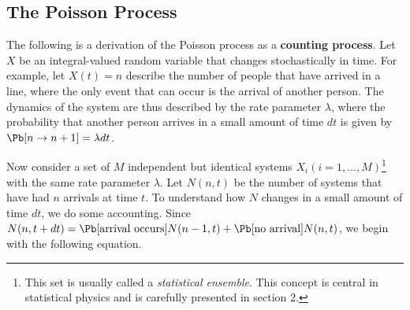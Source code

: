 \subsection{The Poisson Process}
\label{subsection:Poisson_Process}
The following is a derivation of the Poisson process as a \textbf{counting process}. Let $X$ be an integral-valued random variable that changes stochastically in time. For example, let $X(t) = n$ describe the number of people that have arrived in a line, where the only event that can occur is the arrival of another person. The dynamics of the system are thus described by the rate parameter $\lambda$, where the probability that another person arrives in a small amount of time $dt$ is given by $\Pb[n \rightarrow n+1] = \lambda dt$.

Now consider a set  of $M$ independent but identical systems $X_i (i = 1, ..., M)$\footnote{This set is usually called a {\em statistical ensemble}. This concept is central in statistical physics and is carefully presented in section 2.} with the same rate parameter $\lambda$. Let $N(n, t)$ be the number of systems that have had $n$ arrivals at time $t$. To understand how $N$ changes in a small amount of time $dt$, we do some accounting. Since $N(n, t + dt) = \Pb[\textrm{arrival occurs}] N(n-1, t) + \Pb[\textrm{no arrival}] N(n,t)$, we begin with the following equation.

